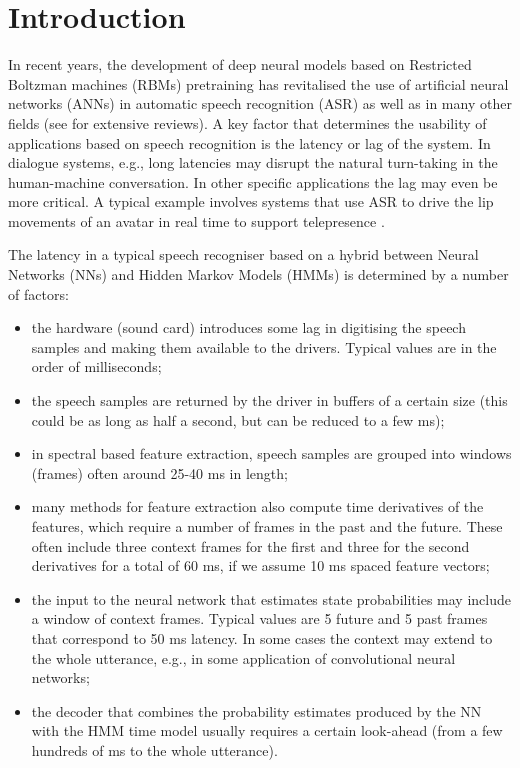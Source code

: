 \section{Introduction}
\label{sec:intro}
In recent years, the development of deep neural models based on Restricted Boltzman machines (RBMs) pretraining has revitalised the use of artificial neural networks (ANNs) in automatic speech recognition (ASR) as well as in many other fields (see \cite{LeCunEtAl2015Nature, Schmidhuber2015NeuralNetworks} for extensive reviews).
A key factor that determines the usability of applications based on speech recognition is the latency or lag of the system.
In dialogue systems, e.g., long latencies may disrupt the natural turn-taking in the human-machine conversation.
In other specific applications the lag may even be more critical.
A typical example involves systems that use ASR to drive the lip movements of an avatar in real time to support telepresence \cite{gs:SalviEtAl2009, MuEtAl2010LipSync, LiEtAl2013ICASSP}.

The latency in a typical speech recogniser based on a hybrid between Neural Networks (NNs) and Hidden Markov Models (HMMs) is determined by a number of factors:
\begin{itemize}
\item the hardware (sound card) introduces some lag in digitising the speech samples and making them available to the drivers. Typical values are in the order of milliseconds;
\item the speech samples are returned by the driver in buffers of a certain size (this could be as long as half a second, but can be reduced to a few ms);
\item in spectral based feature extraction, speech samples are grouped into windows (frames) often around 25-40 ms in length;
\item many methods for feature extraction also compute time derivatives of the features, which require a number of frames in the past and the future. These often include three context frames for the first and three for the second derivatives for a total of 60 ms, if we assume 10 ms spaced feature vectors;
\item the input to the neural network that estimates state probabilities may include a window of context frames. Typical values are 5 future and 5 past frames that correspond to 50 ms latency. In some cases the context may extend to the whole utterance, e.g., in some application of convolutional neural networks;
\item the decoder that combines the probability estimates produced by the NN with the HMM time model usually requires a certain look-ahead (from a few hundreds of ms to the whole utterance).
\end{itemize}

